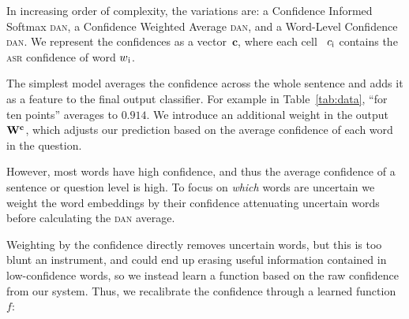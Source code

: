 In increasing order of complexity, the variations are: a Confidence
Informed Softmax \textsc{dan}, a Confidence Weighted Average
\textsc{dan}, and a Word-Level Confidence \textsc{dan}.
We represent the confidences as a vector~$\textbf{c}$, where each cell
~$c\textsubscript{i}$ contains the \textsc{asr} confidence of word
$w\textsubscript{i}$.


The simplest model averages the confidence across the whole sentence
and adds it as a feature to the final output classifier.  For example
in Table~\ref{tab:data}, ``for ten points'' averages to $0.914$. We introduce an additional weight in the output~$\textbf{W\textsuperscript{c}}$, which adjusts our prediction based on the average confidence of each word in the question.

\begin{comment}
We compute this confidence informed classification~$\textbf{o\textsuperscript{*}}$ as:

\begin{equation}
\textbf{o}^{*}  = \mathrm{softmax}([\textbf{W\textsuperscript{(c)}}; \textbf{W\textsuperscript{(o)}}][\frac{\sum_{i}^{N}c\textsubscript{i}}{N};\textbf{h\textsubscript{L}}] + \textbf{b\textsuperscript{(o)}})
\end{equation}

By concatenating the confidence weight~$\textbf{W\textsuperscript{c}}$ to the output weights and the averaged confidence to the final hidden representation.
\end{comment}


However, most words have high confidence, and thus the average confidence of a sentence or question level is high.  To focus on \emph{which} words
are uncertain we weight the word embeddings by their confidence attenuating uncertain words before calculating the \textsc{dan} average.


\begin{comment}
\begin{equation}
\textbf{r\textsuperscript{*}} = \frac{\sum \textbf{E}[w\textsubscript{i}] * c\textsubscript{i}}{N},
\end{equation}
\end{comment}




Weighting by the confidence directly removes uncertain words, but this
is too blunt an instrument, and could end up erasing useful information contained in low-confidence words, so we instead learn a function based
on the raw confidence from our  system.  Thus, we recalibrate
the confidence through a learned function~$f$:

